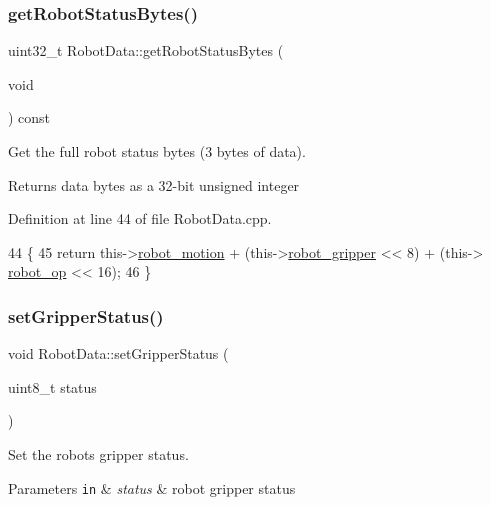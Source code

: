 \subsubsection{\texorpdfstring{get\+Robot\+Status\+Bytes()}{getRobotStatusBytes()}}
{\footnotesize\ttfamily uint32\+\_\+t Robot\+Data\+::get\+Robot\+Status\+Bytes (\begin{DoxyParamCaption}\item[{void}]{ }\end{DoxyParamCaption}) const}



Get the full robot status bytes (3 bytes of data). 

\begin{DoxyReturn}{Returns}
data bytes as a 32-\/bit unsigned integer 
\end{DoxyReturn}


Definition at line 44 of file Robot\+Data.\+cpp.


\begin{DoxyCode}
44                                                   \{
45     \textcolor{keywordflow}{return} this->\hyperlink{class_robot_data_aaa03c73d21d0d28a8b1b3d384d777a1e}{robot\_motion} + (this->\hyperlink{class_robot_data_a83aa1b34c8785aa24e1fc358e50dfc26}{robot\_gripper} << 8) + (this->
      \hyperlink{class_robot_data_aa8c48e89aac7db2af1db825a7f3c1f30}{robot\_op} << 16);
46 \}
\end{DoxyCode}
\mbox{\label{class_robot_data_aa115713d34966f38642357eba5543f16}} 
\subsubsection{\texorpdfstring{set\+Gripper\+Status()}{setGripperStatus()}}
{\footnotesize\ttfamily void Robot\+Data\+::set\+Gripper\+Status (\begin{DoxyParamCaption}\item[{uint8\+\_\+t}]{status }\end{DoxyParamCaption})}



Set the robot\textquotesingle{}s gripper status. 


\begin{DoxyParams}[1]{Parameters}
\mbox{\tt in}  & {\em status} & robot gripper status \\
\hline
\end{DoxyParams}


